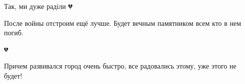  
 
 
 
 

\qqSecCmt


Так, ми дуже раділи 💔


После войны отстроим ещё лучше. Будет вечным памятником всем кто в нем погиб.


💔


Причем развивался город очень быстро, все радовались этому, уже этого не будет!

